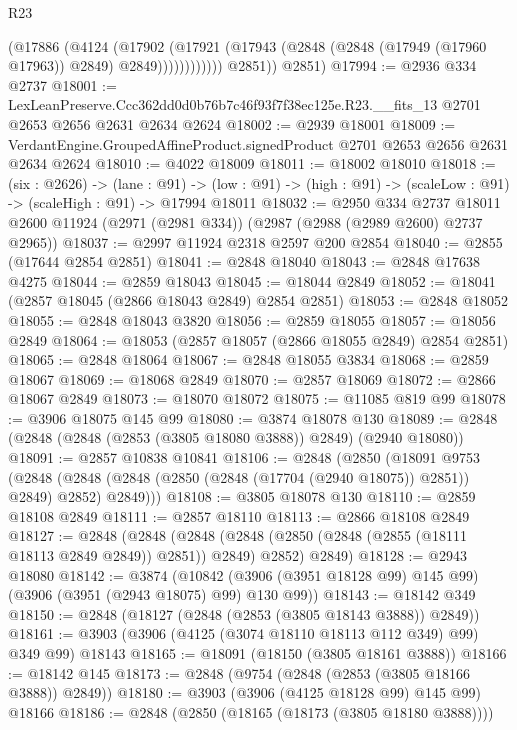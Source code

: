\begin{lexlean}{R23}
\begin{coremodule}
                      (@17886
                        (@4124
                          (@17902
                            (@17921
                              (@17943
                                (@2848 (@2848 (@17949 (@17960 @17963)) @2849) @2849))))))))))))
          @2851))
      @2851)
@17994 := @2936 @334 @2737
@18001 := LexLeanPreserve.Ccc362dd0d0b76b7c46f93f7f38ec125e.R23.__fits_13
    @2701
    @2653
    @2656
    @2631
    @2634
    @2624
@18002 := @2939 @18001
@18009 := VerdantEngine.GroupedAffineProduct.signedProduct @2701 @2653 @2656 @2631 @2634 @2624
@18010 := @4022 @18009
@18011 := @18002 @18010
@18018 := (six : @2626) ->
  (lane : @91) ->
  (low : @91) -> (high : @91) -> (scaleLow : @91) -> (scaleHigh : @91) -> @17994 @18011
@18032 := @2950
    @334
    @2737
    @18011
    @2600
    @11924
    (@2971 (@2981 @334))
    (@2987 (@2988 (@2989 @2600) @2737 @2965))
@18037 := @2997 @11924 @2318 @2597 @200 @2854
@18040 := @2855 (@17644 @2854 @2851)
@18041 := @2848 @18040
@18043 := @2848 @17638 @4275
@18044 := @2859 @18043
@18045 := @18044 @2849
@18052 := @18041 (@2857 @18045 (@2866 @18043 @2849) @2854 @2851)
@18053 := @2848 @18052
@18055 := @2848 @18043 @3820
@18056 := @2859 @18055
@18057 := @18056 @2849
@18064 := @18053 (@2857 @18057 (@2866 @18055 @2849) @2854 @2851)
@18065 := @2848 @18064
@18067 := @2848 @18055 @3834
@18068 := @2859 @18067
@18069 := @18068 @2849
@18070 := @2857 @18069
@18072 := @2866 @18067 @2849
@18073 := @18070 @18072
@18075 := @11085 @819 @99
@18078 := @3906 @18075 @145 @99
@18080 := @3874 @18078 @130
@18089 := @2848 (@2848 (@2848 (@2853 (@3805 @18080 @3888)) @2849) (@2940 @18080))
@18091 := @2857 @10838 @10841
@18106 := @2848
    (@2850
      (@18091
        @9753
        (@2848 (@2848 (@2848 (@2850 (@2848 (@17704 (@2940 @18075)) @2851)) @2849) @2852) @2849)))
@18108 := @3805 @18078 @130
@18110 := @2859 @18108 @2849
@18111 := @2857 @18110
@18113 := @2866 @18108 @2849
@18127 := @2848
    (@2848
      (@2848 (@2848 (@2850 (@2848 (@2855 (@18111 @18113 @2849 @2849)) @2851)) @2849) @2852)
      @2849)
@18128 := @2943 @18080
@18142 := @3874
    (@10842 (@3906 (@3951 @18128 @99) @145 @99) (@3906 (@3951 (@2943 @18075) @99) @130 @99))
@18143 := @18142 @349
@18150 := @2848 (@18127 (@2848 (@2853 (@3805 @18143 @3888)) @2849))
@18161 := @3903 (@3906 (@4125 (@3074 @18110 @18113 @112 @349) @99) @349 @99) @18143
@18165 := @18091 (@18150 (@3805 @18161 @3888))
@18166 := @18142 @145
@18173 := @2848 (@9754 (@2848 (@2853 (@3805 @18166 @3888)) @2849))
@18180 := @3903 (@3906 (@4125 @18128 @99) @145 @99) @18166
@18186 := @2848 (@2850 (@18165 (@18173 (@3805 @18180 @3888))))

\end{coremodule}
\end{lexlean}
